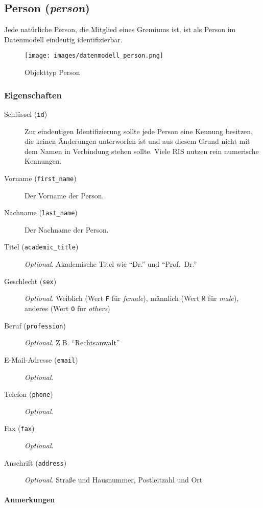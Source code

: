 \documentclass[,a4paper]{article}
\makeatletter
\def\maxwidth{\ifdim\Gin@nat@width>\linewidth\linewidth
\else\Gin@nat@width\fi}
\let\Oldincludegraphics\includegraphics
\renewcommand{\includegraphics}[1]{\Oldincludegraphics[width=\maxwidth]{#1}}
\makeatother
\begin{document}
\subsection{Person (\emph{person})}

Jede natürliche Person, die Mitglied eines Gremiums ist, ist als Person
im Datenmodell eindeutig identifizierbar.

\begin{figure}[htbp]
\centering
\texttt{[image: images/datenmodell\_person.png]}
\caption{Objekttyp Person}
\end{figure}

\subsubsection{Eigenschaften}

\begin{description}
\item[Schlüssel (\texttt{id})]
Zur eindeutigen Identifizierung sollte jede Person eine Kennung
besitzen, die keinen Änderungen unterworfen ist und aus diesem Grund
nicht mit dem Namen in Verbindung stehen sollte. Viele RIS nutzen rein
numerische Kennungen.
\item[Vorname (\texttt{first\_name})]
Der Vorname der Person.
\item[Nachname (\texttt{last\_name})]
Der Nachname der Person.
\item[Titel (\texttt{academic\_title})]
\emph{Optional}. Akademische Titel wie ``Dr.'' und ``Prof.~Dr.''
\item[Geschlecht (\texttt{sex})]
\emph{Optional}. Weiblich (Wert \texttt{F} für \emph{female}), männlich
(Wert \texttt{M} für \emph{male}), anderes (Wert \texttt{O} für
\emph{others})
\item[Beruf (\texttt{profession})]
\emph{Optional}. Z.B. ``Rechtsanwalt''
\item[E-Mail-Adresse (\texttt{email})]
\emph{Optional}.
\item[Telefon (\texttt{phone})]
\emph{Optional}.
\item[Fax (\texttt{fax})]
\emph{Optional}.
\item[Anschrift (\texttt{address})]
\emph{Optional}. Straße und Hausnummer, Postleitzahl und Ort
\end{description}

\paragraph{Anmerkungen}
\end{document}
